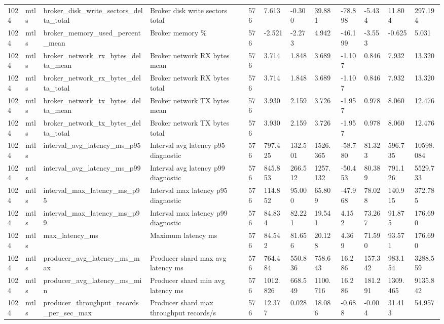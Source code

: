 \begin{longtable}{llllllllllll}
1024 & mtls & broker\_disk\_write\_sectors\_delta\_total & Broker disk write sectors total & 576 & 7.613 & -0.300 & 39.881 & -78.898 & -5.434 & 11.804 & 297.194 \\
1024 & mtls & broker\_memory\_used\_percent\_mean & Broker memory \% & 576 & -2.521 & -2.273 & 4.942 & -46.199 & -3.553 & -0.625 & 5.031 \\
1024 & mtls & broker\_network\_rx\_bytes\_delta\_mean & Broker network RX bytes mean & 576 & 3.714 & 1.848 & 3.689 & -1.107 & 0.846 & 7.932 & 13.320 \\
1024 & mtls & broker\_network\_rx\_bytes\_delta\_total & Broker network RX bytes total & 576 & 3.714 & 1.848 & 3.689 & -1.107 & 0.846 & 7.932 & 13.320 \\
1024 & mtls & broker\_network\_tx\_bytes\_delta\_mean & Broker network TX bytes mean & 576 & 3.930 & 2.159 & 3.726 & -1.957 & 0.978 & 8.060 & 12.476 \\
1024 & mtls & broker\_network\_tx\_bytes\_delta\_total & Broker network TX bytes total & 576 & 3.930 & 2.159 & 3.726 & -1.957 & 0.978 & 8.060 & 12.476 \\
1024 & mtls & interval\_avg\_latency\_ms\_p95 & Interval avg latency p95 diagnostic & 576 & 797.425 & 132.501 & 1526.365 & -58.780 & 81.323 & 596.735 & 10598.084 \\
1024 & mtls & interval\_avg\_latency\_ms\_p99 & Interval avg latency p99 diagnostic & 576 & 845.853 & 266.512 & 1257.132 & -50.453 & 80.389 & 791.126 & 5529.733 \\
1024 & mtls & interval\_max\_latency\_ms\_p95 & Interval max latency p95 diagnostic & 576 & 114.852 & 95.000 & 65.809 & -47.968 & 78.028 & 140.915 & 372.785 \\
1024 & mtls & interval\_max\_latency\_ms\_p99 & Interval max latency p99 diagnostic & 576 & 84.834 & 82.221 & 19.541 & 4.152 & 73.267 & 91.875 & 176.690 \\
1024 & mtls & max\_latency\_ms & Maximum latency ms & 576 & 84.542 & 81.656 & 20.128 & 4.369 & 71.590 & 93.571 & 176.690 \\
1024 & mtls & producer\_avg\_latency\_ms\_max & Producer shard max avg latency ms & 576 & 764.484 & 550.836 & 758.643 & 16.286 & 157.342 & 983.154 & 3288.559 \\
1024 & mtls & producer\_avg\_latency\_ms\_min & Producer shard min avg latency ms & 576 & 1012.826 & 668.549 & 1100.716 & 16.286 & 181.291 & 1309.465 & 9135.842 \\
1024 & mtls & producer\_throughput\_records\_per\_sec\_max & Producer shard max throughput records/s & 576 & 12.377 & 0.028 & 18.086 & -0.688 & -0.004 & 31.413 & 54.957 \\

\end{longtable}
